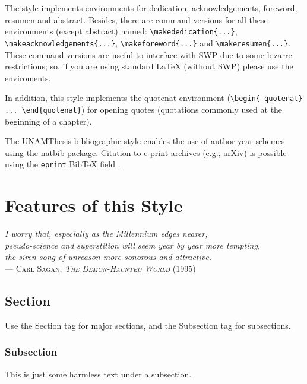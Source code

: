 \documentclass[11pt,spanish]{report}
\begin{document}
The style implements environments for dedication, acknowledgements, foreword, resumen and
abstract. Besides, there are command versions for all these environments (except abstract)
named: \texttt{\textbackslash{}makededication\{...\}},
\texttt{\textbackslash{}makeacknowledgements\{...\}},
\texttt{\textbackslash{}makeforeword\{...\}} and
\texttt{\textbackslash{}makeresumen\{...\}}. These command versions are useful to interface
with SWP due to some bizarre restrictions; so, if you are using standard LaTeX (without SWP)
please use the enviroments.

In addition, this style implements the quotenat environment (\texttt{\textbackslash{}begin\{
quotenat\} ... \textbackslash{}end\{quotenat\}}) for opening quotes (quotations commonly used
at the beginning of a chapter).

The UNAMThesis bibliographic style enables the use of author-year schemes using the natbib
package. Citation to e-print archives (e.g., arXiv) is possible using the \texttt{eprint}
{{\sc Bib}\TeX} field \citep{Keseler2005,Leskovec2008,Lipschutz1986,Marconi1967,
Neidhardt1996,Nelson2000}.

\chapter{Features of this Style}

\begin{quotenat}
\textsl{I worry that, especially as the Millennium edges nearer,\\
pseudo-science and superstition will seem year by year more tempting,\\
the siren song of unreason more sonorous and attractive.}\\
--- \textsc{Carl Sagan, \textit{The Demon-Haunted World} (1995)}

\end{quotenat}

\section{Section}

Use the Section tag for major sections, and the Subsection tag for subsections.

\subsection{Subsection}

This is just some harmless text under a subsection.
\end{document}
